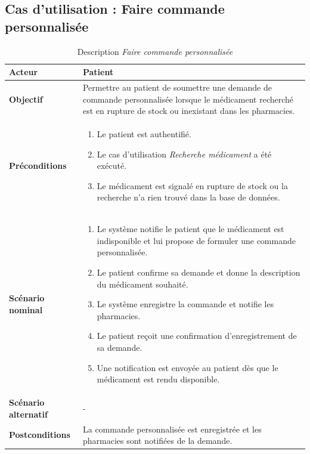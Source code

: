 \documentclass[12pt,a4paper]{report}
\begin{document}
\subsection*{Cas d'utilisation : Faire commande personnalisée}

\begin{table}[H]
    \centering
    \begin{tabular}{|p{4cm}|p{9cm}|}
        \hline
        \textbf{Acteur} & Patient \\
        \hline
        \textbf{Objectif} & Permettre au patient de soumettre une demande de commande personnalisée lorsque le médicament recherché est en rupture de stock ou inexistant dans les pharmacies. \\
        \hline
        \textbf{Préconditions} &
        \begin{enumerate}
            \item Le patient est authentifié.
            \item Le cas d'utilisation \textit{Recherche médicament} a été exécuté.
            \item Le médicament est signalé en rupture de stock ou la recherche n'a rien trouvé dans la base de données.
        \end{enumerate} \\
        \hline
        \textbf{Scénario nominal} &
        \begin{enumerate}
            \item Le système notifie le patient que le médicament est indisponible et lui propose de formuler une commande personnalisée.
            \item Le patient confirme sa demande et donne la description du médicament souhaité.
            \item Le système enregistre la commande et notifie les pharmacies.
            \item Le patient reçoit une confirmation d'enregistrement de sa demande.
            \item Une notification est envoyée au patient dès que le médicament est rendu disponible.
        \end{enumerate} \\
        \hline
        \textbf{Scénario alternatif} & - \\
        \hline
        \textbf{Postconditions} & La commande personnalisée est enregistrée et les pharmacies sont notifiées de la demande. \\
        \hline
    \end{tabular}
    \caption{Description \textit{Faire commande personnalisée}}
\end{table}
\end{document}
